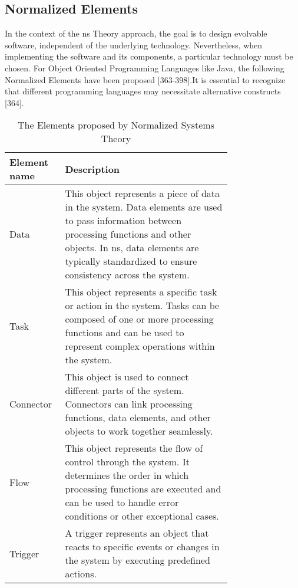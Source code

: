 \subsection{Normalized Elements} \label{subsec_ns_elements} 

In the context of the \gls{ns} Theory approach, the goal is to design evolvable software,
independent of the underlying technology. Nevertheless, when implementing the software and
its components, a particular technology must be chosen. For Object Oriented Programming
Languages like Java, the following Normalized Elements have been proposed
\parencite{mannaert_normalized_2016}[363-398].It is essential to recognize that different
programming languages may necessitate alternative constructs
\parencite{mannaert_normalized_2016}[364].

\begin{table}[H]
    \begin{tabular}{ l p{0.75\linewidth}}
        \hline
        \textbf{Element name} & \textbf{Description} \\ 
        \hline
        Data & This object represents a piece of data in the system. Data elements are
        used to pass information between processing functions and other objects. In
        \gls{ns}, data elements are typically standardized to ensure consistency across
        the system.\\ \midrule

        Task & This object represents a specific task or action in the system. Tasks can
        be composed of one or more processing functions and can be used to represent
        complex operations within the system.\\ \midrule

        Connector & This object is used to connect different parts of the system.
        Connectors can link processing functions, data elements, and other objects to work
        together seamlessly.\\ \midrule

        Flow & This object represents the flow of control through the system.
        It determines the order in which processing functions are executed and can be used
        to handle error conditions or other exceptional cases.\\ \midrule

        Trigger & A trigger represents an object that reacts to specific events or changes in the system
        by executing predefined actions.\\

        \bottomrule
    \end{tabular}
    \caption{The Elements proposed by Normalized Systems Theory}
    \label{ns_element}
\end{table}